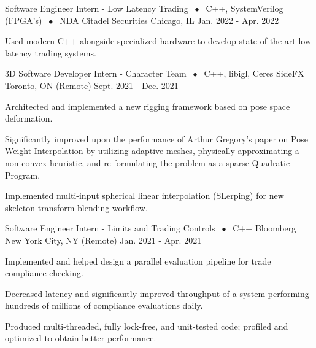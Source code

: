 \begin{cventries}
  \cventry
    {Software Engineer Intern - Low Latency Trading $\;\bullet\;$ C++, SystemVerilog (FPGA's) $\;\bullet\;$ NDA} %
    {Citadel Securities} %
    {Chicago, IL} %
    {Jan. 2022 - Apr. 2022} %
    {
      \begin{cvitems}
      \item Used modern C++ alongside specialized hardware to develop state-of-the-art low latency trading systems.
      \end{cvitems}
    }

  \cventry
  {3D Software Developer Intern - Character Team $\;\bullet\;$ C++, libigl, Ceres} %
    {SideFX} %
    {Toronto, ON (Remote)} %
    {Sept. 2021 - Dec. 2021} %
    {
      \begin{cvitems}
      \item Architected and implemented a new rigging framework based on pose space deformation.
      \item Significantly improved upon the performance of Arthur Gregory's paper on Pose Weight Interpolation by utilizing adaptive meshes, physically approximating a non-convex heuristic, and re-formulating the problem as a sparse Quadratic Program.
      \item Implemented multi-input spherical linear interpolation (SLerping) for new skeleton transform blending workflow.
      \end{cvitems}
    }

  \cventry
    {Software Engineer Intern - Limits and Trading Controls $\;\bullet\;$ C++} %
    {Bloomberg} %
    {New York City, NY (Remote)} %
    {Jan. 2021 - Apr. 2021} %
    {
      \begin{cvitems} %
      \item {Implemented and helped design a parallel evaluation pipeline for trade compliance checking.}
      \item {Decreased latency and significantly improved throughput of a system performing hundreds of millions of compliance evaluations daily.}
      \item {Produced multi-threaded, fully lock-free, and unit-tested code; profiled and optimized to obtain better performance.}
      \end{cvitems}
    }


\end{cventries}
